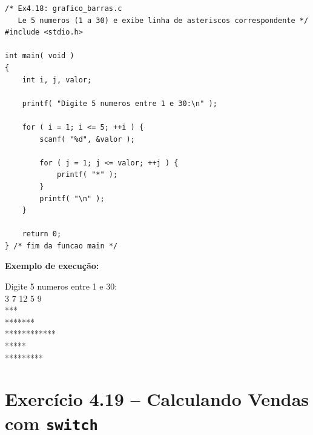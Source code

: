\documentclass[12pt,a4paper]{article}
\begin{document}
\begin{respostabox}
\begin{lstlisting}
/* Ex4.18: grafico_barras.c
   Le 5 numeros (1 a 30) e exibe linha de asteriscos correspondente */
#include <stdio.h>

int main( void )
{
    int i, j, valor;

    printf( "Digite 5 numeros entre 1 e 30:\n" );

    for ( i = 1; i <= 5; ++i ) {
        scanf( "%d", &valor );

        for ( j = 1; j <= valor; ++j ) {
            printf( "*" );
        }
        printf( "\n" );
    }

    return 0;
} /* fim da funcao main */
\end{lstlisting}

\textbf{Exemplo de execução:}
\begin{saida}
Digite 5 numeros entre 1 e 30:\\
3 7 12 5 9\\
***\\
*******\\
************\\
*****\\
*********
\end{saida}
\end{respostabox}

\section{Exercício 4.19 -- Calculando Vendas com \texttt{switch}}
\end{document}
